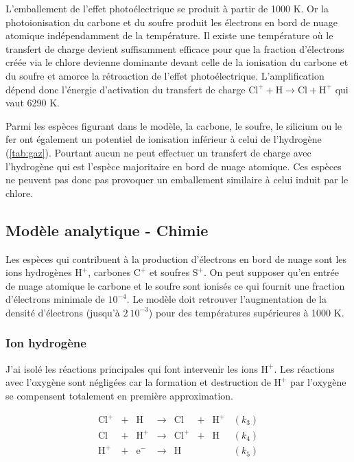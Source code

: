 L'emballement de l'effet photoélectrique se produit à partir de 1000 K. Or la photoionisation du carbone et du soufre produit les électrons en bord de nuage atomique indépendamment de la température. Il existe une température où le transfert de charge devient suffisamment efficace pour que la fraction d'électrons créée via le chlore devienne dominante devant celle de la ionisation du carbone et du soufre et amorce la rétroaction de l'effet photoélectrique. L'amplification dépend donc l'énergie d'activation du transfert de charge $\mathrm{Cl}^+  + \mathrm{H}    \rightarrow \mathrm{Cl}   +  \mathrm{H}^+$ qui vaut 6290 K. \newline

Parmi les espèces figurant dans le modèle, la carbone, le soufre, le silicium ou le fer ont également un potentiel de ionisation inférieur à celui de l'hydrogène (\autoref{tab:gaz}). Pourtant aucun ne peut effectuer un transfert de charge avec l'hydrogène qui est l'espèce majoritaire en bord de nuage atomique. Ces espèces ne peuvent pas donc pas provoquer un emballement similaire à celui induit par le chlore. 




\subsection{Modèle analytique - Chimie}

Les espèces qui contribuent à la production d'électrons en bord de nuage sont les ions hydrogènes $\mathrm{H}^+$, carbones $\mathrm{C}^+$ et soufres $\mathrm{S}^+$. On peut supposer qu'en entrée de nuage atomique le carbone et le soufre sont ionisés ce qui fournit une fraction d'électrons minimale de $10^{-4}$. Le modèle doit retrouver l'augmentation de la densité d'électrons (jusqu'à $2\ 10^{-3}$) pour des températures supérieures à 1000 K.
 
\subsubsection{Ion hydrogène}

J'ai isolé les réactions principales qui font intervenir les ions $\mathrm{H}^+$. Les réactions avec l'oxygène sont négligées car la formation et destruction de $\mathrm{H}^+$ par l'oxygène se compensent totalement en première approximation. 

\begin{equation}
    \begin{array}{lccccclr}
        \mathrm{Cl}^+ & + &\mathrm{H}   & \rightarrow &\mathrm{Cl}  & + & \mathrm{H}^+ & (k_3) \\
        \mathrm{Cl}  & + & \mathrm{H}^+  & \rightarrow & \mathrm{Cl}^+ & + &\mathrm{H}  & (k_4) \\
        \mathrm{H}^+  & + & \mathrm{e}^-  & \rightarrow &\mathrm{H}   &   &     & (k_5) \\
    \end{array}
\end{equation}

